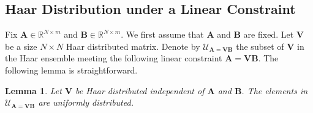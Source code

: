 \documentclass[journal]{IEEEtran}
\renewcommand{\bf}{\bm}
\newcommand{\bb}{\mathbb}
\renewcommand{\cal}{\mathcal}
\newtheorem{lemma}[theorem]{Lemma}
\newcommand{\LL}[1]{\textcolor{black}{#1}}
\begin{document}


\subsection{Haar Distribution under a Linear Constraint}\label{APP:Haar_LC}
Fix $\bf{A}\in \bb{R}^{N\times m}$ and $\bf{B}\in \bb{R}^{N\times m}$. We first assume that $\bf{A}$ and $\bf{B}$ are fixed. Let $\bf{V}$ be a size $N\times N$ Haar distributed matrix. Denote by $\bf{\cal{U}}_{\bf{A}=\bf{VB}}$ the subset of $\bf{V}$ in the Haar ensemble meeting the following linear constraint $\bf{A}=\bf{VB}$.
The  following lemma is straightforward. 

\begin{lemma}\label{Pro:Haar_unifd}
Let $\bf{V}$ be Haar distributed independent of $\bf{A}$ and $\bf{B}$. The elements in $\bf{\mathcal{U}}_{\bf{A}=\bf{VB}}$ are uniformly distributed.
\end{lemma}

 
\end{document}
